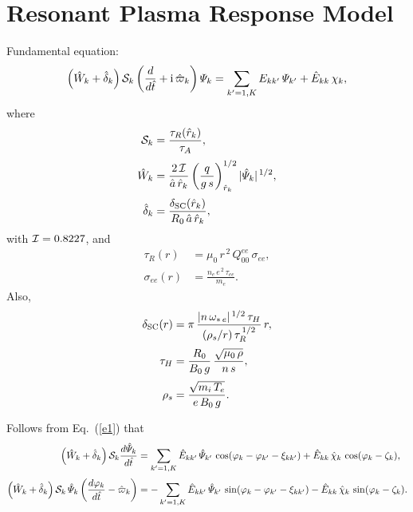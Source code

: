 \documentclass[12pt]{article}
\begin{document}
\section{Resonant Plasma Response Model}
Fundamental equation:
\begin{equation}\label{e1}
\left(\hat{W}_k +\hat{\delta}_k\right){\cal S}_k\left(\frac{d}{d\hat{t}} + {\rm i}\,\hat{\varpi}_k\right){\mit\Psi}_k = \sum_{k'=1,K}E_{kk'}\,{\mit\Psi}_{k'}
+ \hat{E}_{kk}\,\chi_k,
\end{equation}
where
\begin{align}
{\cal S}_k&=\frac{\tau_R(\hat{r}_k)}{\tau_A},\\[0.5ex]
\hat{W}_k &=\frac{2\,{\cal I}}{\hat{a}\,\hat{r}_k}\left(\frac{q}{g\,s}\right)_{\hat{r}_k}^{1/2} |\hat{\mit\Psi}_k|^{\,1/2},\\[0.5ex]
\hat{\delta}_k &= \frac{\delta_{\rm SC}(\hat{r}_k)}{R_0\,\hat{a}\,\hat{r}_k},
\end{align}
with ${\cal I}=0.8227$, and
\begin{align}
\tau_R(r) &= \mu_0\,r^{\,2}\,Q_{00}^{ee}\,\sigma_{ee},\\[0.5ex]
\sigma_{ee}(r) &=\frac{n_e\,e^{\,2}\,\tau_{ee}}{m_e}.
\end{align}
Also,
\begin{align}
\delta_{\rm SC}(r)& = \pi \,\frac{|n\,\omega_{\ast\,e}|^{\,1/2}\,\tau_H}{(\rho_s/r)\,\tau_R^{\,1/2}}\,r,\\[0.5ex]
\tau_H &= \frac{R_0}{B_0\,g}\,\frac{\sqrt{\mu_0\,\rho}}{n\,s},\\[0.5ex]
\rho_s &= \frac{\sqrt{m_i\,T_e}}{e\,B_0\,g}.
\end{align}

Follows from Eq.~(\ref{e1}) that
\begin{align}
\left(\hat{W}_k +\hat{\delta}_k\right){\cal S}_k\frac{d\hat{\mit\Psi}_k}{d\hat{t}}&= \sum_{k'=1,K}\hat{E}_{kk'}\,\hat{\mit\Psi}_{k'}\,\cos(\varphi_k-\varphi_{k'}-\xi_{kk'})
+ \hat{E}_{kk}\,\hat{\chi}_k\,\cos(\varphi_k-\zeta_k),\\[0.5ex]
\left(\hat{W}_k +\hat{\delta}_k\right){\cal S}_k\,\hat{\mit\Psi}_k\left(\frac{d\varphi_k}{d\hat{t}}-\hat{\varpi}_k\right)&=- \sum_{k'=1,K}\hat{E}_{kk'}\,\hat{\mit\Psi}_{k'}\,\sin(\varphi_k-\varphi_{k'}-\xi_{kk'})-
 \hat{E}_{kk}\,\hat{\chi}_k\,\sin(\varphi_k-\zeta_k).
\end{align}
\end{document}
